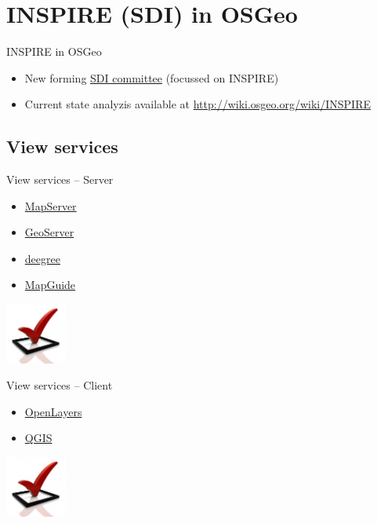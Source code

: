 \documentclass[xcolor=dvipsnames]{beamer}
\begin{document}
\section{INSPIRE (SDI) in OSGeo}

\begin{frame}{INSPIRE in OSGeo}
    \begin{itemize}
        \item New forming
            \href{http://wiki.osgeo.org/wiki/SDI_committee}{SDI committee}
            (focussed on INSPIRE)
        \item Current state analyzis available at
            \url{http://wiki.osgeo.org/wiki/INSPIRE} {\em } 
    \end{itemize}
\end{frame}

\subsection{View services}
\begin{frame}{View services -- Server}
    \begin{itemize}
        \item \href{http://mapserver.org}{MapServer}
        \item \href{http://geoserver.org}{GeoServer}
        \item \href{http://deegree.org}{deegree}
        \item \href{http://mapguide.osgeo.org}{MapGuide}
    \end{itemize}
    \begin{flushright} \includegraphics[width=2cm]{imgs/ils/done.jpg} \end{flushright} 
\end{frame}

\begin{frame}{View services -- Client}
    \begin{itemize}
        \item \href{http://openlayers.org}{OpenLayers}
        \item \href{http://qgis.org}{QGIS}
    \end{itemize}
    \begin{flushright} \includegraphics[width=2cm]{imgs/ils/done.jpg} \end{flushright}
\end{frame}
\end{document}
